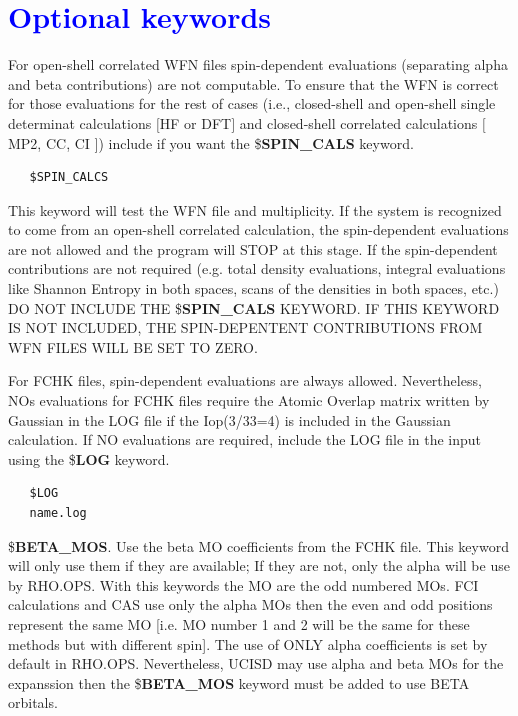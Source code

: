 \documentclass[10pt,a4paper]{article}
\newcommand{\tbl}[1]{{\textcolor{blue}{#1}}}
\begin{document}
\section{\tbl{\textbf{Optional keywords}}}

\noindent For open-shell correlated WFN files spin-dependent evaluations (separating alpha and beta contributions) are not computable. To ensure that the WFN is correct for those evaluations for the rest of cases (i.e., closed-shell and open-shell single determinat calculations $[$HF or DFT$]$  and closed-shell correlated calculations $[$MP2, CC, CI $]$) include if you want the \$\textbf{SPIN\_CALS} keyword.
\begin{verbatim}
   $SPIN_CALCS
\end{verbatim}
\noindent This keyword will test the WFN file and multiplicity. If the system is recognized to come from an open-shell correlated calculation, the spin-dependent evaluations are not allowed and the program will STOP at this stage. If the spin-dependent contributions are not required (e.g. total density evaluations, integral evaluations like Shannon Entropy in both spaces, scans of the densities in both spaces, etc.) DO NOT INCLUDE THE \$\textbf{SPIN\_CALS}  KEYWORD. IF THIS KEYWORD IS NOT INCLUDED, THE SPIN-DEPENTENT CONTRIBUTIONS FROM WFN FILES WILL BE SET TO ZERO.\newline  

\noindent For FCHK files, spin-dependent evaluations are always allowed. Nevertheless, NOs evaluations for FCHK files require the Atomic Overlap matrix  written by Gaussian in the LOG file if the Iop(3/33=4) is included in the Gaussian calculation. If NO evaluations are required, include the LOG file in the input using the \$\textbf{LOG} keyword.   

\begin{verbatim}
   $LOG
   name.log
\end{verbatim}

\noindent \$\textbf{BETA\_MOS}. Use the beta MO coefficients from the FCHK file. This keyword will only use them if they are available; If they are not, only the alpha will be use by RHO.OPS. With this keywords the MO are the odd numbered MOs. FCI calculations and CAS use only the alpha MOs then the even  and odd positions represent the same MO [i.e. MO number 1 and 2 will be the same for these methods but with different spin]. The use of ONLY alpha coefficients is set by default in RHO.OPS. Nevertheless, UCISD may use alpha and beta MOs for the expanssion then the \$\textbf{BETA\_MOS} keyword must be added to use BETA  orbitals.\newline
\end{document}
